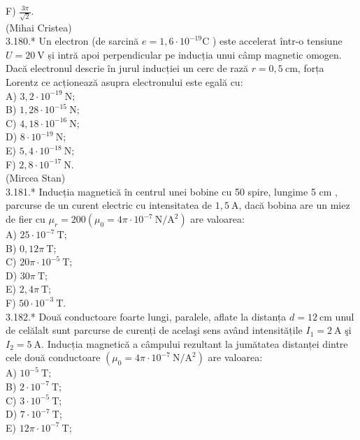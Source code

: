 \documentclass[10pt]{article}
\begin{document}
F) $\frac{3 \pi}{\sqrt{2}}$.\\
(Mihai Cristea)\\
3.180.* Un electron (de sarcină $e=1,6 \cdot 10^{-19} \mathrm{C}$ ) este accelerat într-o tensiune $U=20 \mathrm{~V}$ și intră apoi perpendicular pe inducția unui câmp magnetic omogen. Dacă electronul descrie în jurul inducției un cerc de rază $r=0,5 \mathrm{~cm}$, forța Lorentz ce acționează asupra electronului este egală cu:\\
A) $3,2 \cdot 10^{-19} \mathrm{~N}$;\\
B) $1,28 \cdot 10^{-15} \mathrm{~N}$;\\
C) $4,18 \cdot 10^{-16} \mathrm{~N}$;\\
D) $8 \cdot 10^{-19} \mathrm{~N}$;\\
E) $5,4 \cdot 10^{-18} \mathrm{~N}$;\\
F) $2,8 \cdot 10^{-17} \mathrm{~N}$.\\
(Mircea Stan)\\
3.181.* Inducția magnetică în centrul unei bobine cu 50 spire, lungime 5 cm , parcurse de un curent electric cu intensitatea de $1,5 \mathrm{~A}$, dacă bobina are un miez de fier cu $\mu_{r}=200\left(\mu_{0}=4 \pi \cdot 10^{-7} \mathrm{~N} / \mathrm{A}^{2}\right)$ are valoarea:\\
A) $25 \cdot 10^{-7} \mathrm{~T}$;\\
B) $0,12 \pi \mathrm{~T}$;\\
C) $20 \pi \cdot 10^{-5} \mathrm{~T}$;\\
D) $30 \pi \mathrm{~T}$;\\
E) $2,4 \pi \mathrm{~T}$;\\
F) $50 \cdot 10^{-3} \mathrm{~T}$.\\
3.182.* Două conductoare foarte lungi, paralele, aflate la distanța $d=12 \mathrm{~cm}$ unul de celălalt sunt parcurse de curenți de acelaşi sens având intensitățile $I_{1}=2 \mathrm{~A}$ şi $I_{2}=5 \mathrm{~A}$. Inducția magnetică a câmpului rezultant la jumătatea distanței dintre cele două conductoare $\left(\mu_{0}=4 \pi \cdot 10^{-7} \mathrm{~N} / \mathrm{A}^{2}\right)$ are valoarea:\\
A) $10^{-5} \mathrm{~T}$;\\
B) $2 \cdot 10^{-7} \mathrm{~T}$;\\
C) $3 \cdot 10^{-5} \mathrm{~T}$;\\
D) $7 \cdot 10^{-7} \mathrm{~T}$;\\
E) $12 \pi \cdot 10^{-7} \mathrm{~T}$;\\
\end{document}
